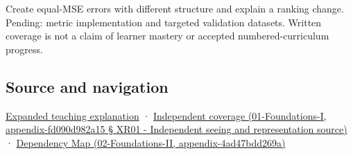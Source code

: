 Create equal-MSE errors with different structure and explain a ranking change. Pending: metric implementation and targeted validation datasets. Written coverage is not a claim of learner mastery or accepted numbered-curriculum progress.

\subsection{Source and navigation}\label{source-and-navigation}

\href{Continuous\%20Notes/University\%20-\%20Worlds,\%20Images\%20and\%20Inference\%20-\%20Graphics,\%20Vision\%20and\%20Photography\#Quality\%20numbers\%20need\%20a\%20question\%20they\%20can\%20actually\%20answer}{Expanded teaching explanation} · \href{}{Independent coverage (01-Foundations-I, appendix-fd090d982a15 § XR01 - Independent seeing and representation source)} · \href{}{Dependency Map (02-Foundations-II, appendix-4ad47bdd269a)}
